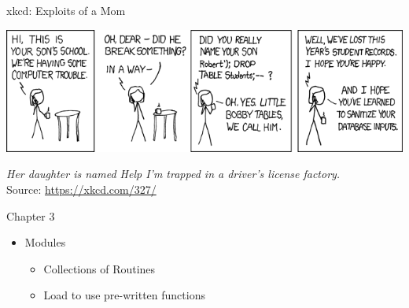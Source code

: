 
\begin{frame}{xkcd: Exploits of a Mom}
%
\begin{center}
	\includegraphics[width=.8\linewidth]{./gfx/xkcd-codeInjection}\\
	\vspace{3pt}
	
	\scriptsize \emph{Her daughter is named Help I'm trapped in a driver's license factory.}
	\vspace{6pt}\\
	
	Source: \url{https://xkcd.com/327/}
\end{center}
%
\end{frame}


\begin{frame}{Chapter 3}
%
\begin{itemize}
\item Modules
	\begin{itemize}
	\item Collections of Routines
	\item Load to use pre-written functions
	\end{itemize}
\end{itemize}
%
\end{frame}


